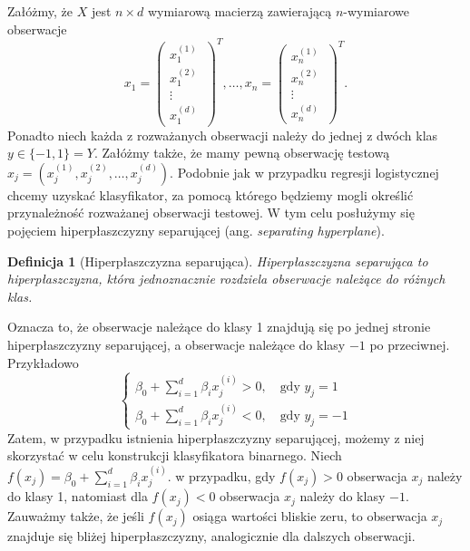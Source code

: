 \documentclass[a4paper]{article}
\newtheorem{defi} {Definicja}
\begin{document}
\newpage
Załóżmy, że $X$ jest $n\times d$ wymiarową macierzą zawierającą $n$-wymiarowe obserwacje 
\begin{equation}
    x_1 = \left( \begin{array}{c}
    x_{1}^{(1)}  \\
    x_{1}^{(2)} \\
    \vdots \\
    x_{1}^{(d)} 
    \
\end{array} \right)^T, 
\dots,x_n = \left( \begin{array}{c}
    x_{n}^{(1)}  \\
    x_{n}^{(2)} \\
    \vdots \\
    x_{n}^{(d)} 
    \
\end{array} \right)^T.
\end{equation}
Ponadto niech każda z rozważanych obserwacji należy do jednej z dwóch klas $y\in\{-1,1\}=Y$. Załóżmy także, że mamy pewną obserwację testową $x_j = (x_j^{(1)},x_j^{(2)},\dots , x_j^{(d)})$. Podobnie jak w przypadku regresji logistycznej chcemy uzyskać klasyfikator, za pomocą którego będziemy mogli określić przynależność rozważanej obserwacji testowej. W tym celu posłużymy się pojęciem hiperpłaszczyzny separującej (ang. \textit{separating hyperplane}).
\begin{defi}[Hiperpłaszczyzna separująca]
Hiperpłaszczyzna separująca to hiperpłaszczyzna, która jednoznacznie rozdziela obserwacje należące do różnych klas.
\end{defi}
Oznacza to, że obserwacje należące do klasy 1 znajdują się po jednej stronie hiperpłaszczyzny separującej, a obserwacje należące do klasy $-1$ po przeciwnej. Przykładowo 
\begin{equation}\label{(2.42)}
\left\{ \begin{array}{ll}
\beta_0 + \sum\limits_{i=1}^d{\beta_ix_{j}^{(i)}} > 0 ,\quad\textrm{gdy $y_j = 1$}  \\
\beta_0 + \sum\limits_{i=1}^d{\beta_ix_{j}^{(i)}} < 0 ,\quad\textrm{gdy $y_j = -1$}  
\end{array} \right.
\end{equation}
\indent Zatem, w przypadku istnienia hiperpłaszczyzny separującej, możemy z niej skorzystać w celu konstrukcji klasyfikatora binarnego. Niech $f(x_j) = \beta_0 + \sum_{i=1}^d{\beta_ix_{j}^{(i)}}$. w przypadku, gdy $f(x_j) > 0$ obserwacja $x_j$ należy do klasy 1, natomiast dla $f(x_j) < 0$ obserwacja $x_j$ należy do klasy $-1$. Zauważmy także, że jeśli $f(x_j)$ osiąga wartości bliskie zeru, to obserwacja $x_j$ znajduje się bliżej hiperpłaszczyzny, analogicznie dla dalszych obserwacji.
\end{document}
